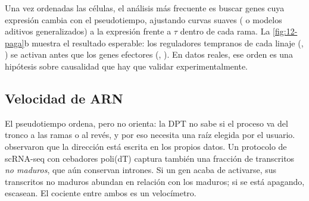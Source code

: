 Una vez ordenadas las células, el análisis más frecuente es buscar genes cuya expresión cambia con el pseudotiempo, ajustando curvas suaves ( o modelos aditivos generalizados) a la expresión frente a $\tau$ dentro de cada rama. La \cref{fig:12-paga}b muestra el resultado esperable: los reguladores tempranos de cada linaje (, ) se activan antes que los genes efectores (, ). En datos reales, ese orden es una hipótesis sobre causalidad que hay que validar experimentalmente.

\subsection{Velocidad de ARN}

El pseudotiempo ordena, pero no orienta: la DPT no sabe si el proceso va del tronco a las ramas o al revés, y por eso necesita una raíz elegida por el usuario. \textcite{c12-lamanno2018} observaron que la dirección está escrita en los propios datos. Un protocolo de scRNA-seq con cebadores poli(dT) captura también una fracción de transcritos \emph{no maduros}, que aún conservan intrones. Si un gen acaba de activarse, sus transcritos no maduros abundan en relación con los maduros; si se está apagando, escasean. El cociente entre ambos es un velocímetro.

